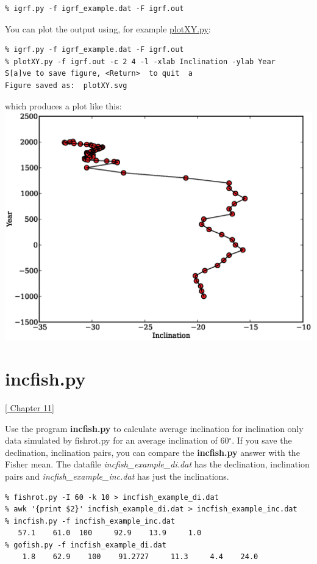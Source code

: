 \documentclass[11pt]{book}
\begin{document}
{{{\begin{verbatim}
% igrf.py -f igrf_example.dat -F igrf.out
\end{verbatim}

You can plot the output using, for example \href{#plotXY.py}{plotXY.py}:  

\begin{verbatim}
% igrf.py -f igrf_example.dat -F igrf.out
% plotXY.py -f igrf.out -c 2 4 -l -xlab Inclination -ylab Year
S[a]ve to save figure, <Return>  to quit  a
Figure saved as:  plotXY.svg
\end{verbatim}

which produces a plot like this:  
  \includegraphics[width=15 cm]{EPSfiles/plotXY.eps}


\section {\bf incfish.py}
\href{http://Webbook2.html#Fisher_statistics}{ [ Chapter 11]}

Use the program {\bf incfish.py} to calculate average inclination for inclination only data 
simulated by fishrot.py for an average inclination of 60$^{\circ}$.   If you save the declination, inclination 
pairs, you can compare the {\bf incfish.py} answer with the Fisher mean.    The datafile {\it incfish\_example\_di.dat} has the declination, inclination pairs and {\it incfish\_example\_inc.dat} has just the inclinations.  

\begin{verbatim}
% fishrot.py -I 60 -k 10 > incfish_example_di.dat
% awk '{print $2}' incfish_example_di.dat > incfish_example_inc.dat
% incfish.py -f incfish_example_inc.dat 
   57.1    61.0  100     92.9    13.9     1.0
% gofish.py -f incfish_example_di.dat 
    1.8    62.9    100    91.2727     11.3     4.4    24.0
\end{verbatim}

}}}
\end{document}
